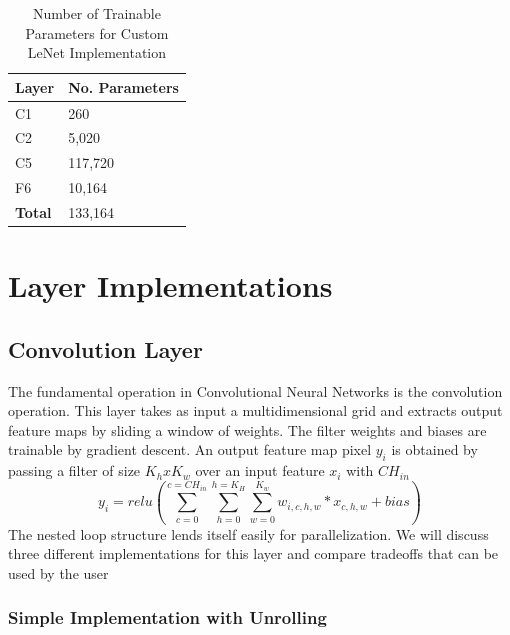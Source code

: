 \begin{table}[]
\centering
\begin{tabular}{ll}
\hline
\multicolumn{1}{|l|}{\textbf{Layer}} & \multicolumn{1}{l|}{ \textbf{No. Parameters}} \\ \hline
\multicolumn{1}{|l|}{C1}    & \multicolumn{1}{l|}{260}                            \\ \hline
\multicolumn{1}{|l|}{C2}    & \multicolumn{1}{l|}{5,020}                          \\ \hline
\multicolumn{1}{|l|}{C5}    & \multicolumn{1}{l|}{117,720}                        \\ \hline
\multicolumn{1}{|l|}{F6}    & \multicolumn{1}{l|}{10,164}                        \\ \hline
\multicolumn{1}{|l|}{\textbf{Total}}    & \multicolumn{1}{l|}{133,164}                        \\ \hline
\end{tabular}
\label{tab:custom-lenet}        
\caption{Number of Trainable Parameters for Custom LeNet Implementation}             
\end{table}


\section{Layer Implementations}

\subsection{Convolution Layer}

The fundamental operation in Convolutional Neural Networks is the convolution operation. This layer takes as input a multidimensional grid and extracts output feature maps by sliding a window of weights. The filter weights and biases are trainable by gradient descent. An output feature map pixel $ \mathit{y_{i}} $ is obtained by passing a filter of size $ K_{h}xK_{w} $ over an input feature $ \mathit{x_{i}} $ with $ \mathit{CH_{in}} $
\begin{equation}
 y_{i} = relu(\sum_{c=0}^{c=CH_{in}} \sum_{h=0}^{h=K_{H}} \sum_{w=0}^{K_{w}} w_{i,c,h,w} * x_{c,h,w}  + bias ) 
\end{equation}
The nested loop structure lends itself easily for parallelization.  We will discuss three different implementations for this layer and compare tradeoffs that can be used by the user 

\subsubsection{Simple Implementation with Unrolling}

